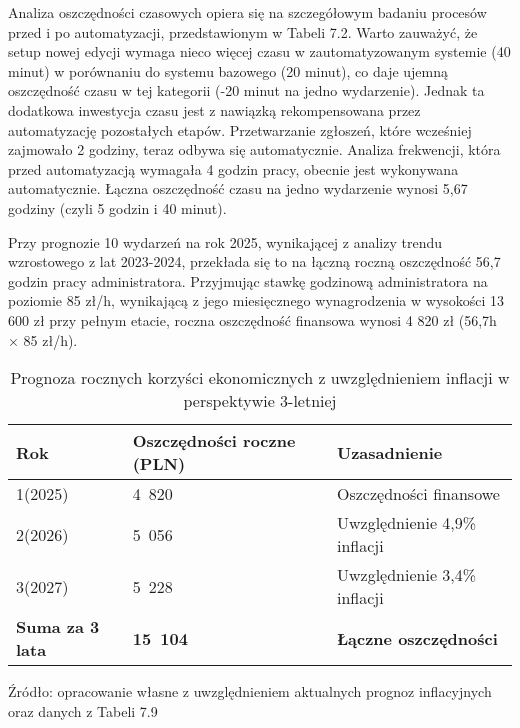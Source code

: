 Analiza oszczędności czasowych opiera się na szczegółowym badaniu procesów przed i po automatyzacji, przedstawionym w Tabeli 7.2. Warto zauważyć, że setup nowej edycji wymaga nieco więcej czasu w zautomatyzowanym systemie (40 minut) w porównaniu do systemu bazowego (20 minut), co daje ujemną oszczędność czasu w tej kategorii (-20 minut na jedno wydarzenie). Jednak ta dodatkowa inwestycja czasu jest z nawiązką rekompensowana przez automatyzację pozostałych etapów. Przetwarzanie zgłoszeń, które wcześniej zajmowało 2 godziny, teraz odbywa się automatycznie. Analiza frekwencji, która przed automatyzacją wymagała 4 godzin pracy, obecnie jest wykonywana automatycznie. Łączna oszczędność czasu na jedno wydarzenie wynosi 5,67 godziny (czyli 5 godzin i 40 minut). 

\break
Przy prognozie 10 wydarzeń na rok 2025, wynikającej z analizy trendu wzrostowego z lat 2023-2024, przekłada się to na łączną roczną oszczędność 56,7 godzin pracy administratora. Przyjmując stawkę godzinową administratora na poziomie 85 zł/h, wynikającą z jego miesięcznego wynagrodzenia w wysokości 13 600 zł przy pełnym etacie, roczna oszczędność finansowa wynosi 4 820 zł (56,7h × 85 zł/h).

\begin{table}[ht]
    \centering
    \caption[Prognoza rocznych korzyści ekonomicznych z uwzględnieniem inflacji w perspektywie 3-letniej, źródło: opracowanie własne z uwzględnieniem aktualnych prognoz inflacyjnych \cite{NBP2025} oraz danych z Tabeli 7.9]{Prognoza rocznych korzyści ekonomicznych z uwzględnieniem inflacji w perspektywie 3-letniej}
    \renewcommand{\arraystretch}{1.3} %
    \begin{tabular}{| p{} | p{} | p{} |}
        \hline
        \textbf{Rok} & \textbf{Oszczędności roczne (PLN)} & \textbf{Uzasadnienie} \\
        \hline
        1(2025) & 4~820 & Oszczędności finansowe \\
        \hline
        2(2026) & 5~056 & Uwzględnienie 4,9\% inflacji \\
        \hline
        3(2027) & 5~228 & Uwzględnienie 3,4\% inflacji \\
        \hline
        \textbf{Suma za 3 lata} & \textbf{15~104} & \textbf{Łączne oszczędności} \\
        \hline
    \end{tabular}
    \vspace{0.5em}
    \par\raggedright\footnotesize{Źródło: opracowanie własne z uwzględnieniem aktualnych prognoz inflacyjnych \cite{NBP2025} oraz danych z Tabeli 7.9}
\end{table}

